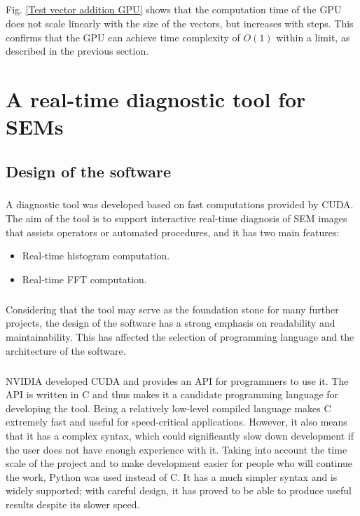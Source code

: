 \documentclass[12pt, twocolumn]{report}
\begin{document}
\paragraph{}
Fig. \ref{Test vector addition GPU} shows that the computation time of the GPU does not scale linearly with the size of the vectors, but increases with steps. This confirms that the GPU can achieve time complexity of $O(1)$ within a limit, as described in the previous section.

\chapter{A real-time diagnostic tool for SEMs}
\section{Design of the software}
\paragraph{}
A diagnostic tool was developed based on fast computations provided by CUDA. The aim of the tool is to support interactive real-time diagnosis of SEM images that assists operators or automated procedures, and it has two main features:
\begin{itemize}
    \item Real-time histogram computation.
    \item Real-time FFT computation.
\end{itemize}

\paragraph{}
Considering that the tool may serve as the foundation stone for many further projects, the design of the software has a strong emphasis on readability and maintainability. This has affected the selection of programming language and the architecture of the software.

\paragraph{}
NVIDIA developed CUDA and provides an API for programmers to use it. The API is written in C and thus makes it a candidate programming language for developing the tool. Being a relatively low-level compiled language makes C extremely fast and useful for speed-critical applications. However, it also means that it has a complex syntax, which could significantly slow down development if the user does not have enough experience with it. Taking into account the time scale of the project and to make development easier for people who will continue the work, Python was used instead of C. It has a much simpler syntax and is widely supported; with careful design, it has proved to be able to produce useful results despite its slower speed.
\end{document}
